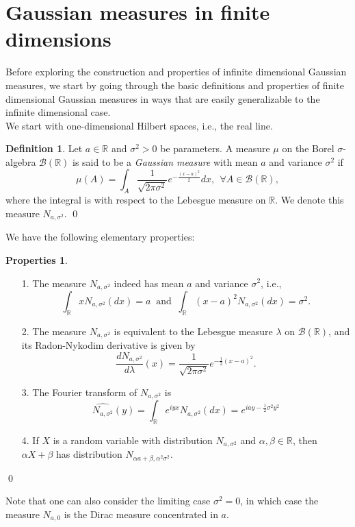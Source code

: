 \documentclass[10pt, a4paper]{report}
\newcommand{\R}[0]{\mathbb{R}}
\theoremstyle{definition}
\newtheorem{definition}{Definition}
\newtheorem*{properties*}{Properties}
\theoremstyle{remark}
\begin{document}
\section{Gaussian measures in finite dimensions}
Before exploring the construction and properties of infinite dimensional Gaussian measures, we start by going through the basic definitions and properties of finite dimensional Gaussian measures in ways that are easily generalizable to the infinite dimensional case.\\
We start with one-dimensional Hilbert spaces, i.e., the real line.
\begin{definition}
	Let $a\in \R$ and $\sigma^2>0$  be parameters. A measure $\mu$ on the Borel $\sigma$-algebra $\mathcal{B}(\R)$ is said to be a \emph{Gaussian measure} with mean $a$ and variance $\sigma^2$ if 
	\begin{equation}
		\mu(A) = \int_{A} \frac{1}{\sqrt{2\pi\sigma^2}}e^{-\frac{(x-a)^2}{2}}dx, \ \ \forall A \in \mathcal{B}(\R),
	\end{equation}
	where the integral is with respect to the Lebesgue measure on $\R$. We denote this measure $N_{a,\sigma^2}$. \qed
\end{definition}
We have the following elementary properties:
\begin{properties*}
	\begin{itemize}
		\item[]
		\item[1.] The measure $N_{a,\sigma^2}$ indeed has mean $a$ and variance $\sigma^2$, i.e., 
		\[ \int_{\R}x N_{a,\sigma^2}(dx) = a \ \text{ and } \ \int_{\R}(x-a)^2 N_{a,\sigma^2}(dx)=\sigma^2. \]
		\item[2.] The measure $N_{a,\sigma^2}$ is equivalent to the Lebesgue measure $\lambda$ on $\mathcal{B}(\R)$, and its Radon-Nykodim derivative is given by 
		\[\frac{dN_{a,\sigma^2}}{d\lambda}(x) = \frac{1}{\sqrt{2\pi\sigma^2}}e^{-\frac{1}{2}(x-a)^2}. \]
		\item[3.] The Fourier transform of $N_{a,\sigma^2}$ is 
		\[\widehat{N_{a,\sigma^2}}(y) = \int_{\R} e^{iyx} N_{a,\sigma^2}(dx) = e^{iay-\frac{1}{2}\sigma^2 y^2} \]
		\item[4.] If $X$ is a random variable with distribution $N_{a,\sigma^2}$ and $\alpha,\beta \in \R$, then $\alpha X + \beta$ has distribution $N_{\alpha a + \beta, \alpha^2 \sigma^2}$. 
	\end{itemize}\qed
\end{properties*}
Note that one can also consider the limiting case $\sigma^2 = 0$, in which case the measure $N_{a,0}$ is the Dirac measure concentrated in $a$. \\
\end{document}
